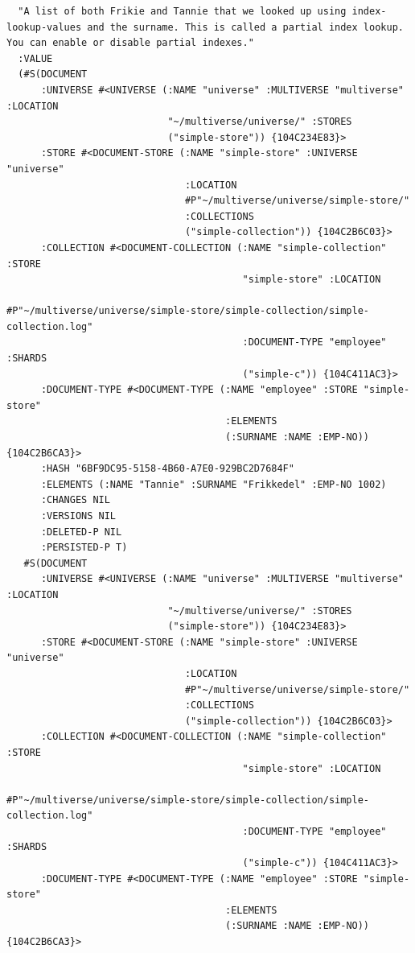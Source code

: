 \documentclass[11pt]{article}
\begin{document}
\begin{verbatim}
  "A list of both Frikie and Tannie that we looked up using index-lookup-values and the surname. This is called a partial index lookup. You can enable or disable partial indexes."
  :VALUE
  (#S(DOCUMENT
      :UNIVERSE #<UNIVERSE (:NAME "universe" :MULTIVERSE "multiverse" :LOCATION
                            "~/multiverse/universe/" :STORES
                            ("simple-store")) {104C234E83}>
      :STORE #<DOCUMENT-STORE (:NAME "simple-store" :UNIVERSE "universe"
                               :LOCATION
                               #P"~/multiverse/universe/simple-store/"
                               :COLLECTIONS
                               ("simple-collection")) {104C2B6C03}>
      :COLLECTION #<DOCUMENT-COLLECTION (:NAME "simple-collection" :STORE
                                         "simple-store" :LOCATION
                                         #P"~/multiverse/universe/simple-store/simple-collection/simple-collection.log"
                                         :DOCUMENT-TYPE "employee" :SHARDS
                                         ("simple-c")) {104C411AC3}>
      :DOCUMENT-TYPE #<DOCUMENT-TYPE (:NAME "employee" :STORE "simple-store"
                                      :ELEMENTS
                                      (:SURNAME :NAME :EMP-NO)) {104C2B6CA3}>
      :HASH "6BF9DC95-5158-4B60-A7E0-929BC2D7684F"
      :ELEMENTS (:NAME "Tannie" :SURNAME "Frikkedel" :EMP-NO 1002)
      :CHANGES NIL
      :VERSIONS NIL
      :DELETED-P NIL
      :PERSISTED-P T)
   #S(DOCUMENT
      :UNIVERSE #<UNIVERSE (:NAME "universe" :MULTIVERSE "multiverse" :LOCATION
                            "~/multiverse/universe/" :STORES
                            ("simple-store")) {104C234E83}>
      :STORE #<DOCUMENT-STORE (:NAME "simple-store" :UNIVERSE "universe"
                               :LOCATION
                               #P"~/multiverse/universe/simple-store/"
                               :COLLECTIONS
                               ("simple-collection")) {104C2B6C03}>
      :COLLECTION #<DOCUMENT-COLLECTION (:NAME "simple-collection" :STORE
                                         "simple-store" :LOCATION
                                         #P"~/multiverse/universe/simple-store/simple-collection/simple-collection.log"
                                         :DOCUMENT-TYPE "employee" :SHARDS
                                         ("simple-c")) {104C411AC3}>
      :DOCUMENT-TYPE #<DOCUMENT-TYPE (:NAME "employee" :STORE "simple-store"
                                      :ELEMENTS
                                      (:SURNAME :NAME :EMP-NO)) {104C2B6CA3}>

\end{verbatim}
\end{document}

